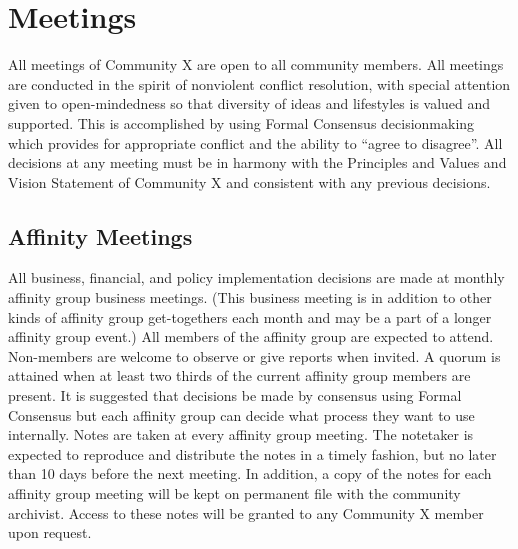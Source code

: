 \section*{Meetings}
All meetings of Community X are open to all community members.  All meetings are conducted in the spirit of nonviolent conflict resolution, with special attention given to open-mindedness so that diversity of ideas and lifestyles is valued and supported.  This is accomplished by using Formal Consensus decisionmaking which provides for appropriate conflict and the ability to ``agree to disagree''.  All decisions at any meeting must be in harmony with the Principles and Values and Vision Statement of Community X and consistent with any previous decisions.

\subsection*{Affinity Meetings}
All business, financial, and policy implementation decisions are made at monthly affinity group business meetings. (This business meeting is in addition to other kinds of affinity group get-togethers each month and may be a part of a longer affinity group event.)  All members of the affinity group are expected to attend. Non-members are welcome to observe or give reports when invited. A quorum is attained when at least two thirds of the current affinity group members are present.  It is suggested that decisions be made by consensus using Formal Consensus but each affinity group can decide what process they want to use internally. Notes are taken at every affinity group meeting. The notetaker is expected to reproduce and distribute the notes in a timely fashion, but no later than 10 days before the next meeting. In addition, a copy of the notes for each affinity group meeting will be kept on permanent file with the community archivist. Access to these notes will be granted to any Community X member upon request.

